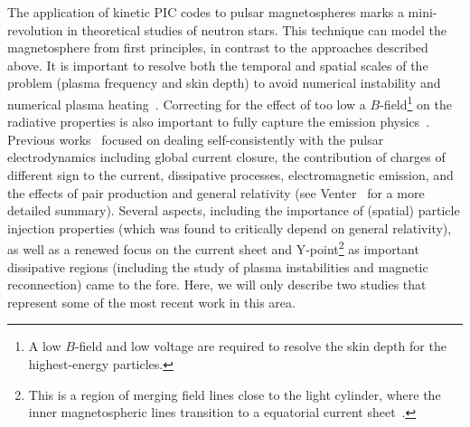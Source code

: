 \documentclass{PoS}
\begin{document}
The application of kinetic PIC codes to pulsar magnetospheres marks a mini-revolution in theoretical studies of neutron stars. This technique can model the magnetosphere from first principles, in contrast to the approaches described above. It is important to resolve both the temporal and spatial scales of the problem (plasma frequency and skin depth) to avoid numerical instability and numerical plasma heating~\cite{Brambilla18}. Correcting for the effect of too low a $B$-field\footnote{A low $B$-field and low voltage are required to resolve the skin depth for the highest-energy particles.} on the radiative properties is also important to fully capture the emission physics~\cite{Kalapotharakos17b}. Previous works~\cite{Belyaev15a,Belyaev15b,Chen14,Cerutti15,Cerutti16a,Cerutti16b,Cerutti17b,Philippov14,Philippov15a,Philippov15b,Kalapotharakos17b} focused on dealing self-consistently with the pulsar electrodynamics including global current closure, the contribution of charges of different sign to the current, dissipative processes, electromagnetic emission, and the effects of pair production and general relativity (see Venter~\cite{Venter16_HEASA} for a more detailed summary). Several aspects, including the importance of (spatial) particle injection properties (which was found to critically depend on general relativity), as well as a renewed focus on the current sheet and Y-point\footnote{This is a region of merging field lines close to the light cylinder, where the inner magnetospheric lines transition to a equatorial current sheet~\cite{Timokhin06}.} as important dissipative regions (including the study of plasma instabilities and magnetic reconnection) came to the fore. Here, we will only describe two studies that represent some of the most recent work in this area.
\end{document}

